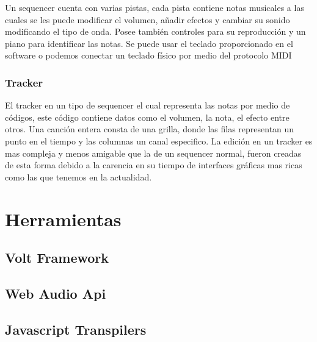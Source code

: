 Un sequencer cuenta con varias pistas, cada pista contiene notas musicales
a las cuales se les puede modificar el volumen, añadir efectos y cambiar
su sonido modificando el tipo de onda. Posee también controles para su
reproducción y un piano para identificar las notas. Se puede usar
el teclado proporcionado en el software o podemos conectar un teclado
físico por medio del protocolo MIDI

\subsubsection{Tracker}

El tracker en un tipo de sequencer el cual representa las notas por medio
de códigos, este código contiene datos como el volumen, la nota, el efecto
entre otros. Una canción entera consta de una grilla, donde las filas
representan un punto en el tiempo y las columnas un canal especifico.
La edición en un tracker es mas compleja y menos amigable que
la de un sequencer normal, fueron creadas de esta forma debido a la
carencia en su tiempo de interfaces gráficas mas ricas como las que
tenemos en la actualidad.

\section{Herramientas}
\subsection{Volt Framework}
\subsection{Web Audio Api}
\subsection{Javascript Transpilers}
